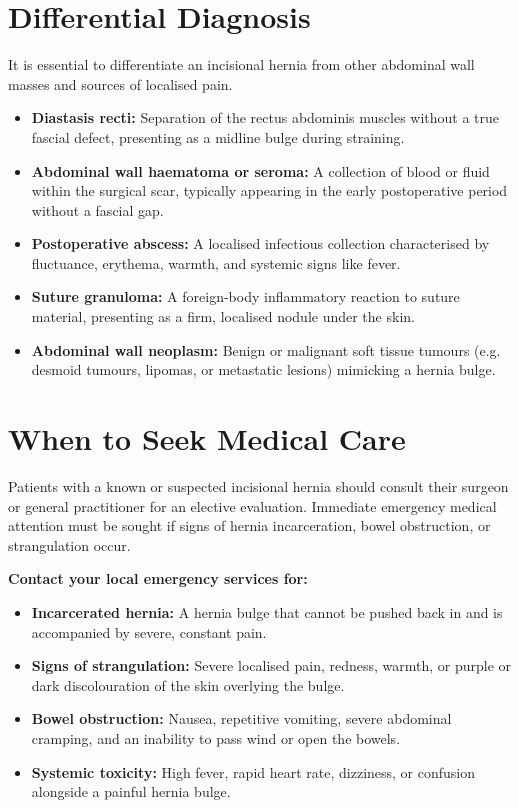 \section*{Differential Diagnosis}
It is essential to differentiate an incisional hernia from other abdominal wall masses and sources of localised pain.
\begin{itemize}
    \item \textbf{Diastasis recti:} Separation of the rectus abdominis muscles without a true fascial defect, presenting as a midline bulge during straining.
    \item \textbf{Abdominal wall haematoma or seroma:} A collection of blood or fluid within the surgical scar, typically appearing in the early postoperative period without a fascial gap.
    \item \textbf{Postoperative abscess:} A localised infectious collection characterised by fluctuance, erythema, warmth, and systemic signs like fever.
    \item \textbf{Suture granuloma:} A foreign-body inflammatory reaction to suture material, presenting as a firm, localised nodule under the skin.
    \item \textbf{Abdominal wall neoplasm:} Benign or malignant soft tissue tumours (e.g. desmoid tumours, lipomas, or metastatic lesions) mimicking a hernia bulge.
\end{itemize}

\section*{When to Seek Medical Care}
Patients with a known or suspected incisional hernia should consult their surgeon or general practitioner for an elective evaluation. Immediate emergency medical attention must be sought if signs of hernia incarceration, bowel obstruction, or strangulation occur.

\textbf{Contact your local emergency services for:}
\begin{itemize}
    \item \textbf{Incarcerated hernia:} A hernia bulge that cannot be pushed back in and is accompanied by severe, constant pain.
    \item \textbf{Signs of strangulation:} Severe localised pain, redness, warmth, or purple or dark discolouration of the skin overlying the bulge.
    \item \textbf{Bowel obstruction:} Nausea, repetitive vomiting, severe abdominal cramping, and an inability to pass wind or open the bowels.
    \item \textbf{Systemic toxicity:} High fever, rapid heart rate, dizziness, or confusion alongside a painful hernia bulge.
\end{itemize}

